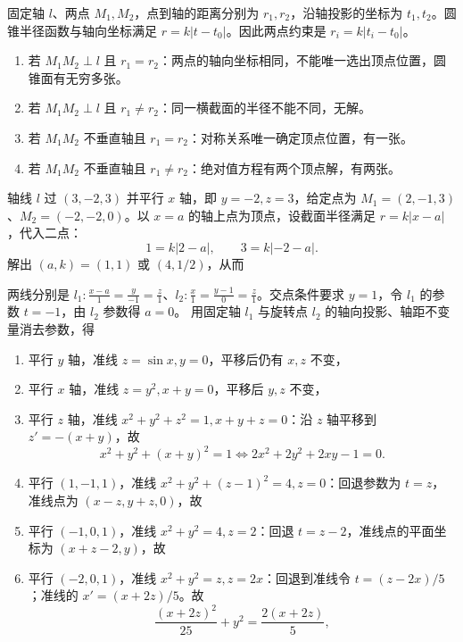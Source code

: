 固定轴 $l$、两点 $M_1,M_2$，点到轴的距离分别为 $r_1,r_2$，沿轴投影的坐标为 $t_1,t_2$。圆锥半径函数与轴向坐标满足 $r=k|t-t_0|$。因此两点约束是 $r_i=k|t_i-t_0|$。
\begin{enumerate}[label=(\arabic*)]
\item 若 $M_1M_2\perp l$ 且 $r_1=r_2$：两点的轴向坐标相同，不能唯一选出顶点位置，圆锥面有无穷多张。
\item 若 $M_1M_2\perp l$ 且 $r_1\ne r_2$：同一横截面的半径不能不同，无解。
\item 若 $M_1M_2$ 不垂直轴且 $r_1=r_2$：对称关系唯一确定顶点位置，有一张。
\item 若 $M_1M_2$ 不垂直轴且 $r_1\ne r_2$：绝对值方程有两个顶点解，有两张。
\end{enumerate}

轴线 $l$ 过 $(3,-2,3)$ 并平行 $x$ 轴，即 $y=-2,z=3$，给定点为 $M_1=(2,-1,3)$、$M_2=(-2,-2,0)$。以 $x=a$ 的轴上点为顶点，设截面半径满足 $r=k|x-a|$，代入二点：
\[1=k|2-a|,\qquad3=k|-2-a|.\]
解出 $(a,k)=(1,1)$ 或 $(4,1/2)$，从而

两线分别是 $l_1:\frac{x-a}{1}=\frac y{-1}=\frac z1$、$l_2:\frac x1=\frac{y-1}{0}=\frac z1$。交点条件要求 $y=1$，令 $l_1$ 的参数 $t=-1$，由 $l_2$ 参数得 $a=0$。
用固定轴 $l_1$ 与旋转点 $l_2$ 的轴向投影、轴距不变量消去参数，得

\begin{enumerate}[label=(\arabic*)]
\item 平行 $y$ 轴，准线 $z=\sin x,y=0$，平移后仍有 $x,z$ 不变，
\item 平行 $x$ 轴，准线 $z=y^2,x+y=0$，平移后 $y,z$ 不变，
\item 平行 $z$ 轴，准线 $x^2+y^2+z^2=1,x+y+z=0$：沿 $z$ 轴平移到 $z'=-(x+y)$，故
\[x^2+y^2+(x+y)^2=1\iff2x^2+2y^2+2xy-1=0.\]
\item 平行 $(1,-1,1)$，准线 $x^2+y^2+(z-1)^2=4,z=0$：回退参数为 $t=z$，准线点为 $(x-z,y+z,0)$，故
\item 平行 $(-1,0,1)$，准线 $x^2+y^2=4,z=2$：回退 $t=z-2$，准线点的平面坐标为 $(x+z-2,y)$，故
\item 平行 $(-2,0,1)$，准线 $x^2+y^2=z,z=2x$：回退到准线令 $t=(z-2x)/5$；准线的 $x'=(x+2z)/5$。故
\[\frac{(x+2z)^2}{25}+y^2=\frac{2(x+2z)}5,\]
\end{enumerate}

